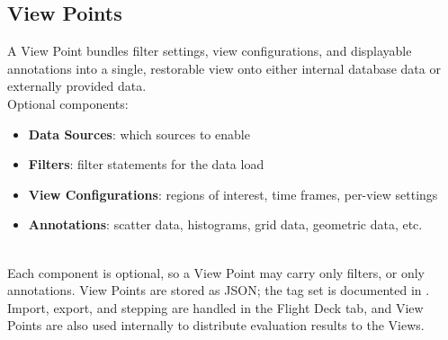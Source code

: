 \subsection*{View Points}
\label{sec:key_concepts_viewpoints}

A View Point bundles filter settings, view configurations, and displayable annotations into a single, restorable view onto either internal database data or externally provided data. \\

Optional components:

\begin{itemize}
    \item \textbf{Data Sources}: which sources to enable
    \item \textbf{Filters}: filter statements for the data load
    \item \textbf{View Configurations}: regions of interest, time frames, per-view settings
    \item \textbf{Annotations}: scatter data, histograms, grid data, geometric data, etc.
\end{itemize}
\ \\

Each component is optional, so a View Point may carry only filters, or only annotations. View Points are stored as JSON; the tag set is documented in . Import, export, and stepping are handled in the Flight Deck  tab, and View Points are also used internally to distribute evaluation results to the Views. \\
